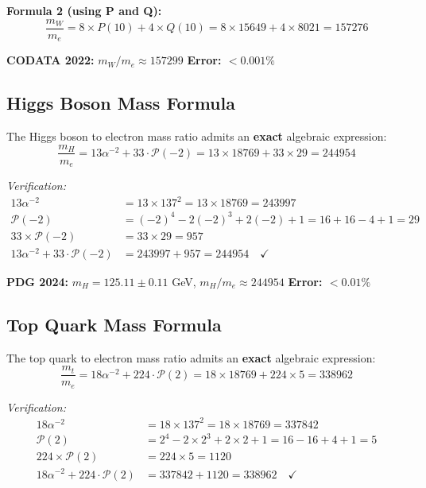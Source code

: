 \documentclass[11pt,a4paper]{article}
\begin{document}
\textbf{Formula 2 (using P and Q):}
\[
\frac{m_W}{m_e} = 8 \times P(10) + 4 \times Q(10) = 8 \times 15649 + 4 \times 8021 = 157276
\]

\textbf{CODATA 2022:} $m_W/m_e \approx 157299$ \quad \textbf{Error: $< 0.001\%$}

\subsection{Higgs Boson Mass Formula}

\begin{theorem}
The Higgs boson to electron mass ratio admits an \textbf{exact} algebraic expression:
\[
\boxed{\frac{m_H}{m_e} = 13\alpha^{-2} + 33 \cdot \mathcal{P}(-2) = 13 \times 18769 + 33 \times 29 = 244954}
\]
\end{theorem}

\textit{Verification:}
\begin{align}
13\alpha^{-2} &= 13 \times 137^2 = 13 \times 18769 = 243997 \\
\mathcal{P}(-2) &= (-2)^4 - 2(-2)^3 + 2(-2) + 1 = 16 + 16 - 4 + 1 = 29 \\
33 \times \mathcal{P}(-2) &= 33 \times 29 = 957 \\
13\alpha^{-2} + 33 \cdot \mathcal{P}(-2) &= 243997 + 957 = 244954 \quad \checkmark
\end{align}

\textbf{PDG 2024:} $m_H = 125.11 \pm 0.11$ GeV, $m_H/m_e \approx 244954$ \quad \textbf{Error: $< 0.01\%$}

\subsection{Top Quark Mass Formula}

\begin{theorem}
The top quark to electron mass ratio admits an \textbf{exact} algebraic expression:
\[
\boxed{\frac{m_t}{m_e} = 18\alpha^{-2} + 224 \cdot \mathcal{P}(2) = 18 \times 18769 + 224 \times 5 = 338962}
\]
\end{theorem}

\textit{Verification:}
\begin{align}
18\alpha^{-2} &= 18 \times 137^2 = 18 \times 18769 = 337842 \\
\mathcal{P}(2) &= 2^4 - 2 \times 2^3 + 2 \times 2 + 1 = 16 - 16 + 4 + 1 = 5 \\
224 \times \mathcal{P}(2) &= 224 \times 5 = 1120 \\
18\alpha^{-2} + 224 \cdot \mathcal{P}(2) &= 337842 + 1120 = 338962 \quad \checkmark
\end{align}
\end{document}
